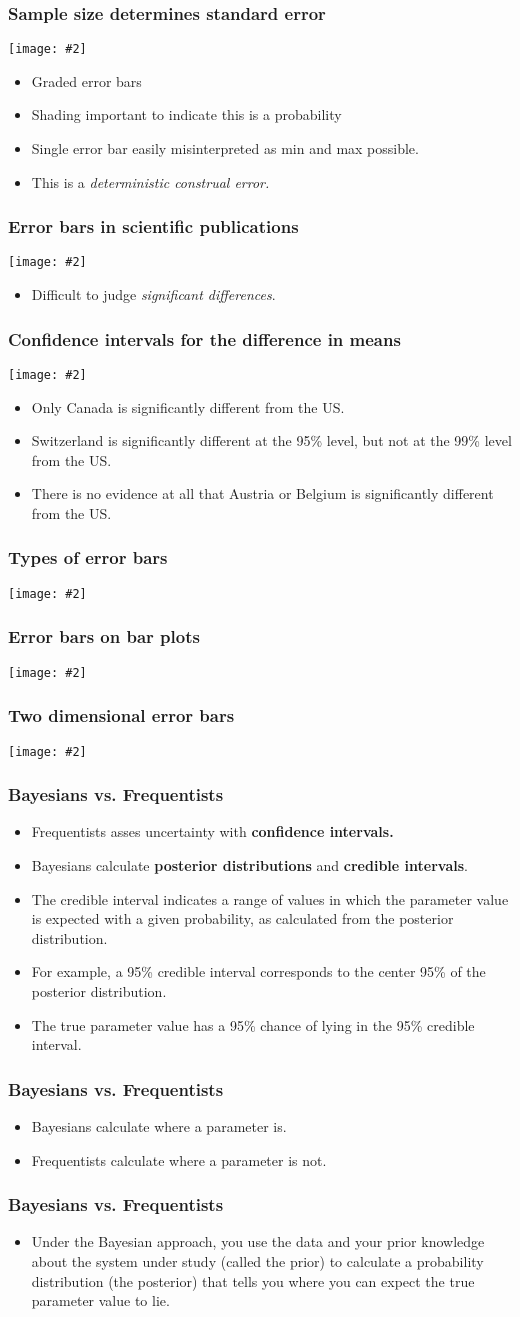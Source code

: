 \documentclass{beamer}
\newcommand{\bi}{\begin{itemize}}
\newcommand{\li}{\item}
\newcommand{\ei}{\end{itemize}}
\newcommand{\fig}[2]{\centerline{\texttt{[image: \#2]}}}
\newcommand{\bfr}[1]{\begin{frame}[fragile]\frametitle{{ #1 }}}
\begin{document}
\bfr{Sample size determines standard error}
\fig{1}{cocoa-CI-vs-n-1.png}
\bi
\li Graded error bars
\li Shading important to indicate this is a probability
\li Single error bar easily misinterpreted as min and max possible.
\li This is a {\em deterministic construal error.}
\ei
\end{frame}

\bfr{Error bars in scientific publications}
\fig{1}{mean-chocolate-ratings-1.png}
\bi
\li Difficult to judge {\em significant differences}.
\ei
\end{frame}
\bfr{Confidence intervals for the difference in means}
\fig{1}{chocolate-ratings-contrasts-1.png}
\scriptsize
\bi
\li Only Canada is significantly different from the US.
\li Switzerland is  significantly different at the 95\% level, but not at the 99\% level from the US.
\li There is no evidence at all that Austria or Belgium is significantly different from the US.
\ei
\end{frame}

\bfr{Types of error bars}
\fig{1}{confidence-visualizations-1.png}
\end{frame}

\bfr{Error bars on bar plots}
\fig{1}{butterfat-bars-1.png}
\end{frame}

\bfr{Two dimensional error bars}
\fig{1}{median-age-income-1.png}
\end{frame}

\bfr{Bayesians vs. Frequentists}
\bi
\li Frequentists asses uncertainty with {\bf confidence intervals.}
\li Bayesians calculate {\bf posterior distributions} and {\bf credible intervals}.
\li The credible interval indicates a range of values in which the parameter value is expected with a given probability, as calculated from the posterior distribution.
\li For example, a 95\% credible interval corresponds to the center 95\% of the posterior distribution.
\li The true parameter value has a 95\% chance of lying in the 95\% credible interval.
\ei
\end{frame}

\bfr{Bayesians vs. Frequentists}
\bi
\li Bayesians calculate where a parameter is.
\li Frequentists calculate where a parameter is not.
\ei
\end{frame}

\bfr{Bayesians vs. Frequentists}
\bi
\li Under the Bayesian approach, you use the data and your prior knowledge about the system under study (called the prior) to calculate a probability distribution (the posterior) that tells you where you can expect the true parameter value to lie.
\ei
\end{frame}
\end{document}
